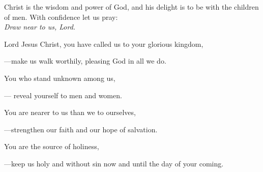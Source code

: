 \intercessions\indent

\begin{hangpar}

Christ is the wisdom and power of God, and his delight is to be with the children of men. With confidence let us pray:\\
\emph{Draw near to us, Lord.}

\medskip Lord Jesus Christ, you have called us to your glorious kingdom,

{\color{red}---\thinspace}make us walk worthily, pleasing God in all we do.

\medskip You who stand unknown among us,

— reveal yourself to men and women.

\medskip You are nearer to us than we to ourselves,

{\color{red}---\thinspace}strengthen our faith and our hope of salvation.

\medskip You are the source of holiness,

{\color{red}---\thinspace}keep us holy and without sin now and until the day of your coming.

\end{hangpar}